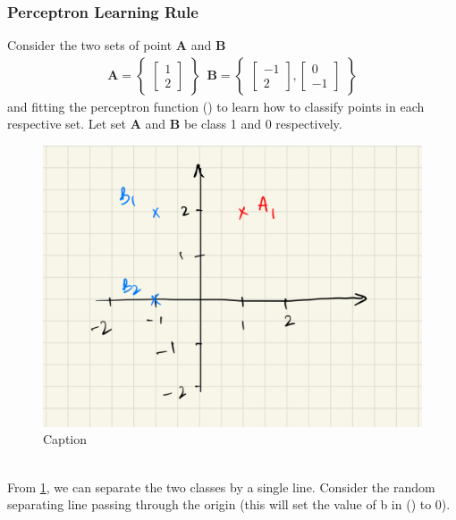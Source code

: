 \subsubsection{Perceptron Learning Rule}
\noindent Consider the two sets of point \textbf{A} and \textbf{B} 
\begin{align}
  \textbf{A} =
  \begin{Bmatrix}
    \begin{bmatrix}
      1 \\ 
      2
    \end{bmatrix}
  \end{Bmatrix}
   \, \, \, 
  \textbf{B} =
\begin{Bmatrix}
  \begin{bmatrix}
    -1 \\
    2
  \end{bmatrix},
  \begin{bmatrix}
    0 \\
    -1
  \end{bmatrix}
  \end{Bmatrix}
\end{align}
and fitting the perceptron function () to learn how to classify points in each respective set. Let set \textbf{A} and \textbf{B} be class 1 and 0 respectively.
\begin{figure}[h]
  \centering
  \includegraphics[scale=0.15]{CHAPTER_2/c2_fig_perceptron_example_1.jpeg}
  \caption{Caption}
  \label{fig:perceptron_example_1}
\end{figure}\\
From \ref{fig:perceptron_example_1}, we can separate the two classes by a single line. Consider the random separating line passing through the origin (this will set the value of b in () to 0).\\
